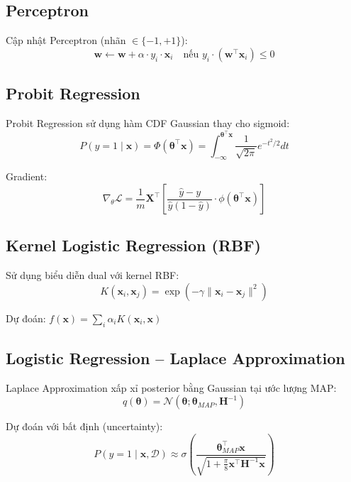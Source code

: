 \documentclass[12pt, a4paper]{article}
\begin{document}
\subsection{Perceptron}
\label{ssec:perceptron}

Cập nhật Perceptron (nhãn $\in \{-1, +1\}$):
$$\mathbf{w} \leftarrow \mathbf{w} + \alpha \cdot y_i \cdot \mathbf{x}_i \quad \text{nếu } y_i \cdot (\mathbf{w}^\top \mathbf{x}_i) \leq 0$$


\subsection{Probit Regression}
\label{ssec:probit}

Probit Regression sử dụng hàm CDF Gaussian thay cho sigmoid:
$$P(y=1 \mid \mathbf{x}) = \Phi(\mathbf{\theta}^\top \mathbf{x}) = \int_{-\infty}^{\mathbf{\theta}^\top \mathbf{x}} \frac{1}{\sqrt{2\pi}}e^{-t^2/2}dt$$

Gradient:
$$\nabla_\theta \mathcal{L} = \frac{1}{m}\mathbf{X}^\top \left[\frac{\hat{y} - y}{\hat{y}(1-\hat{y})} \cdot \phi(\mathbf{\theta}^\top \mathbf{x})\right]$$


\subsection{Kernel Logistic Regression (RBF)}
\label{ssec:kernel_lr}

Sử dụng biểu diễn dual với kernel RBF:
$$K(\mathbf{x}_i, \mathbf{x}_j) = \exp\left(-\gamma\|\mathbf{x}_i - \mathbf{x}_j\|^2\right)$$

Dự đoán: $f(\mathbf{x}) = \sum_i \alpha_i K(\mathbf{x}_i, \mathbf{x})$


\subsection{Logistic Regression -- Laplace Approximation}
\label{ssec:laplace}

Laplace Approximation xấp xỉ posterior bằng Gaussian tại ước lượng MAP:
$$q(\mathbf{\theta}) = \mathcal{N}(\mathbf{\theta}; \mathbf{\theta}_{MAP}, \mathbf{H}^{-1})$$

Dự đoán với bất định (uncertainty):
$$P(y=1 \mid \mathbf{x}, \mathcal{D}) \approx \sigma\!\left(\frac{\mathbf{\theta}_{MAP}^\top \mathbf{x}}{\sqrt{1 + \frac{\pi}{8}\mathbf{x}^\top\mathbf{H}^{-1}\mathbf{x}}}\right)$$
\end{document}
